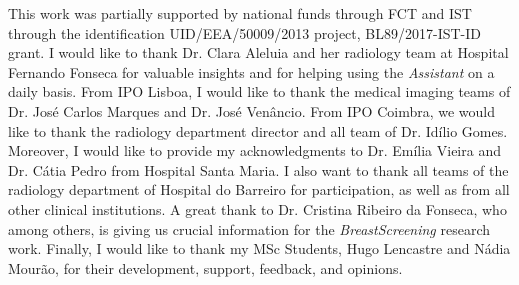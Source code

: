 
This work was partially supported by national funds through FCT and IST through the identification  UID/EEA/50009/2013 project, BL89/2017-IST-ID grant.
I would like to thank Dr. Clara Aleluia and her radiology team at Hospital Fernando Fonseca for valuable insights and for helping using the {\it Assistant} on a daily basis.
From IPO Lisboa, I would like to thank the medical imaging teams of Dr. Jos\'{e} Carlos Marques and Dr. Jos\'{e} Ven\^{a}ncio.
From IPO Coimbra, we would like to thank the radiology department director and all team of Dr. Id\'{i}lio Gomes.
Moreover, I would like to provide my acknowledgments to Dr. Em\'{i}lia Vieira and Dr. C\'{a}tia Pedro from Hospital Santa Maria.
I also want to thank all teams of the radiology department of Hospital do Barreiro for participation, as well as from all other clinical institutions.
A great thank to Dr. Cristina Ribeiro da Fonseca, who among others, is giving us crucial information for the {\it BreastScreening} research work.
Finally, I would like to thank my MSc Students, Hugo Lencastre and N\'{a}dia Mour\~{a}o, for their development, support, feedback, and opinions.